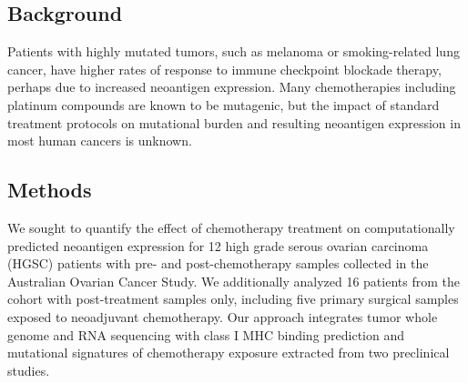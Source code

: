 \subsection*{Background}
Patients with highly mutated tumors, such as melanoma or smoking-related lung cancer, have higher rates of response to immune checkpoint blockade therapy, perhaps due to increased neoantigen expression. Many chemotherapies including platinum compounds are known to be mutagenic, but the impact of standard treatment protocols on mutational burden and resulting neoantigen expression in most human cancers is unknown.


\subsection*{Methods}

We sought to quantify the effect of chemotherapy treatment on computationally predicted neoantigen expression for 12 high grade serous ovarian carcinoma (HGSC) patients with pre- and post-chemotherapy samples collected in the Australian Ovarian Cancer Study. We additionally analyzed 16 patients from the cohort with post-treatment samples only, including five primary surgical samples exposed to neoadjuvant chemotherapy. Our approach integrates tumor whole genome and RNA sequencing with class I MHC binding prediction and mutational signatures of chemotherapy exposure extracted from two preclinical studies.




